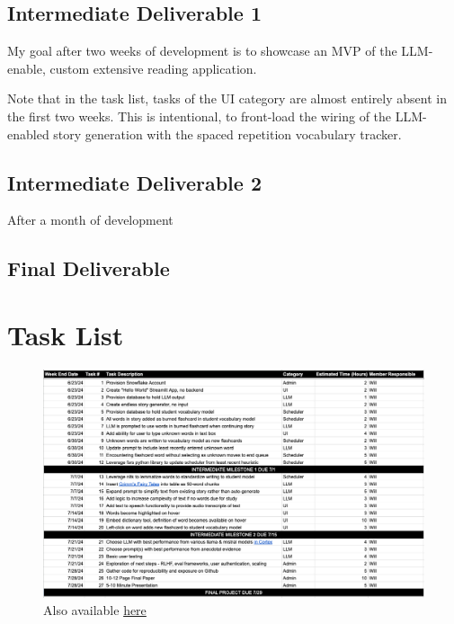 \documentclass[
	letterpaper, %
]{jdf}
\begin{document}
\subsection{Intermediate Deliverable 1}
My goal after two weeks of development is to showcase an MVP of the LLM-enable, custom extensive reading application. 

Note that in the task list, tasks of the UI category are almost entirely absent in the first two weeks. This is intentional, to front-load the wiring of the LLM-enabled story generation with the spaced repetition vocabulary tracker. 

\subsection{Intermediate Deliverable 2}
After a month of development

\subsection{Final Deliverable}

\section{Task List}

\begin{figure}[H]
    \centering
    \includegraphics[width=0.9\linewidth]{Project Proposal/project_plan.png}
    \caption{Also available \href{https://docs.google.com/spreadsheets/d/10IeplrSFJeub_BLcY34Mex57YlT-x3DftFnladG2l4g/edit?usp=sharing}{here}}
    \label{Task List}
\end{figure}

\printbibliography{}
\end{document}
